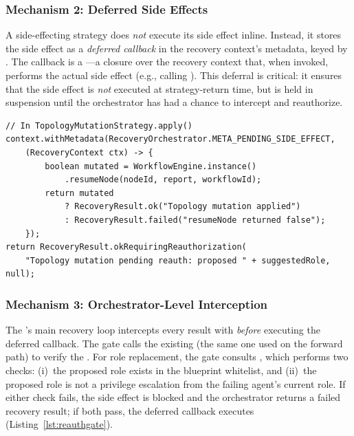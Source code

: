 \subsubsection{Mechanism 2: Deferred Side Effects}
A side-effecting strategy does \emph{not} execute its side effect inline. Instead, it stores the side effect as a \emph{deferred callback} in the recovery context's metadata, keyed by . The callback is a ---a closure over the recovery context that, when invoked, performs the actual side effect (e.g., calling ). This deferral is critical: it ensures that the side effect is \emph{not} executed at strategy-return time, but is held in suspension until the orchestrator has had a chance to intercept and reauthorize.

\begin{lstlisting}[caption={Deferring the side effect in \code{TopologyMutationStrategy}; the strategy declares reauthorization need but does not execute the side effect.},label={lst:defer-side-effect}]
// In TopologyMutationStrategy.apply()
context.withMetadata(RecoveryOrchestrator.META_PENDING_SIDE_EFFECT,
    (RecoveryContext ctx) -> {
        boolean mutated = WorkflowEngine.instance()
            .resumeNode(nodeId, report, workflowId);
        return mutated
            ? RecoveryResult.ok("Topology mutation applied")
            : RecoveryResult.failed("resumeNode returned false");
    });
return RecoveryResult.okRequiringReauthorization(
    "Topology mutation pending reauth: proposed " + suggestedRole, null);
\end{lstlisting}

\subsubsection{Mechanism 3: Orchestrator-Level Interception}
The 's main recovery loop intercepts every result with  \emph{before} executing the deferred callback. The gate calls the existing  (the same one used on the forward path) to verify the \privinv{}. For role replacement, the gate consults , which performs two checks: (i)~the proposed role exists in the blueprint whitelist, and (ii)~the proposed role is not a privilege escalation from the failing agent's current role. If either check fails, the side effect is blocked and the orchestrator returns a failed recovery result; if both pass, the deferred callback executes (Listing~\ref{lst:reauthgate}).

